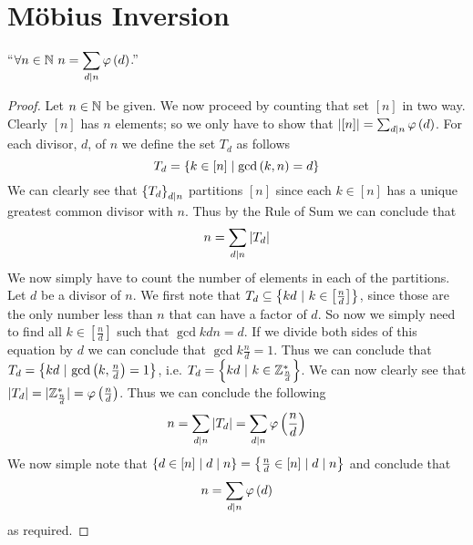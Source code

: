     \section{M\"obius Inversion}
        \begin{definition}
        \end{definition}
        \begin{theorem}
            ``$\forall n \in \mathbb{N} \ n = \displaystyle\sum_{d \mid n} \varphi\left(d\right)$.''
        \end{theorem}
        \begin{proof}
            Let $n \in \mathbb{N}$ be given. We now proceed by counting that set $[n]$ in two way. Clearly
            $[n]$ has $n$ elements; so we only have to show that $|[n]| = \sum_{d \mid n} \varphi\left(d\right)$.
            For each divisor, $d$, of $n$ we define the set $T_d$ as follows
            \[
                T_d = \left\{k \in [n] \mid \mathrm{gcd}\left(k, n\right) = d\right\}
            \]
            We can clearly see that $\left\{T_d\right\}_{d \mid n}$ partitions $[n]$ since each $k \in [n]$
            has a unique greatest common divisor with $n$. Thus by the Rule of Sum we can conclude that
            \[
                n = \sum_{d \mid n} |T_d|
            \]
            We now simply have to count the number of elements in each of the partitions. Let $d$ be a
            divisor of $n$. We first note that $T_d \subseteq \left\{kd \ | \ k \in \left[\frac{n}{d}\right]\right\}$,
            since those are the only number less than $n$ that can have a factor of $d$. So now we simply
            need to find all $k \in \left[\frac{n}{d}\right]$ such that $\gcd{kd}{n} = d$. If we divide both
            sides of this equation by $d$ we can conclude that $\gcd{k}{\frac{n}{d}} = 1$. Thus we can conclude
            that $T_d = \Set{kd \ | \ \gcd{k}{\frac{n}{d}} = 1}$, i.e.
            $T_d = \left\{kd \ | \ k \in \mathbb{Z}_{\frac{n}{d}}^{*}\right\}$. We can now clearly see that
            $|T_d| = |\mathbb{Z}_{\frac{n}{d}}^{*}| = \varphi\left(\frac{n}{d}\right)$. Thus we can conclude the following
            \[
                n = \sum_{d \mid n} |T_d| = \sum_{d \mid n} \varphi\left(\frac{n}{d}\right)
            \]
            We now simple note that
            $\left\{d \in [n] \mid d \mid n\right\} = \left\{\frac{n}{d} \in [n] \mid d \mid n\right\}$ and
            conclude that
            \[
                n = \sum_{d \mid n} \varphi\left(d\right)
            \]
            as required. \QED
        \end{proof}
        \begin{definition}
        \end{definition}
